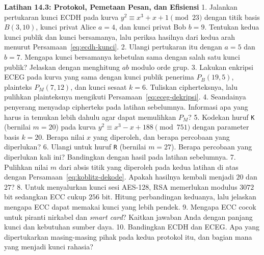 \begin{obereflection}
\textbf{Latihan 14.3: Protokol, Pemetaan Pesan, dan Efisiensi}
1. Jalankan pertukaran kunci ECDH pada kurva $y^2 \equiv x^3 + x + 1 \pmod{23}$
   dengan titik basis $B(3,10)$, kunci privat Alice $a = 4$, dan kunci privat
   Bob $b = 9$. Tentukan kedua kunci publik dan kunci bersamanya, lalu periksa
   hasilnya dari kedua arah menurut Persamaan~\eqref{eq:ecdh-kunci}.
2. Ulangi pertukaran itu dengan $a = 5$ dan $b = 7$. Mengapa kunci bersamanya
   kebetulan sama dengan salah satu kunci publik? Jelaskan dengan menghitung
   $ab$ modulo orde grup.
3. Lakukan enkripsi ECEG pada kurva yang sama dengan kunci publik penerima
   $P_B(19,5)$, plainteks $P_M(7,12)$, dan kunci sesaat $k = 6$. Tuliskan
   cipherteksnya, lalu pulihkan plainteksnya mengikuti
   Persamaan~\eqref{eq:eceg-dekripsi}.
4. Seandainya penyerang menyadap cipherteks pada latihan sebelumnya. Informasi
   apa yang harus ia temukan lebih dahulu agar dapat memulihkan $P_M$?
5. Kodekan huruf \texttt{K} (bernilai $m = 20$) pada kurva
   $y^2 \equiv x^3 - x + 188 \pmod{751}$ dengan parameter basis $k = 20$.
   Berapa nilai $x$ yang diperoleh, dan berapa percobaan yang diperlukan?
6. Ulangi untuk huruf \texttt{R} (bernilai $m = 27$). Berapa percobaan yang
   diperlukan kali ini? Bandingkan dengan hasil pada latihan sebelumnya.
7. Pulihkan nilai $m$ dari absis titik yang diperoleh pada kedua latihan di
   atas dengan Persamaan~\eqref{eq:koblitz-dekode}. Apakah hasilnya kembali
   menjadi $20$ dan $27$?
8. Untuk menyalurkan kunci sesi AES-128, RSA memerlukan modulus $3072$ bit
   sedangkan ECC cukup $256$ bit. Hitung perbandingan keduanya, lalu jelaskan
   mengapa ECC dapat memakai kunci yang lebih pendek.
9. Mengapa ECC cocok untuk piranti nirkabel dan \textit{smart card}? Kaitkan
   jawaban Anda dengan panjang kunci dan kebutuhan sumber daya.
10. Bandingkan ECDH dan ECEG. Apa yang dipertukarkan masing-masing pihak pada
    kedua protokol itu, dan bagian mana yang menjadi kunci rahasia?
\end{obereflection}
